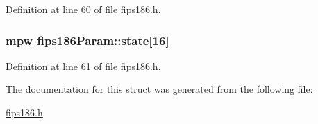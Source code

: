 Definition at line 60 of file fips186.h.\hypertarget{structfips186Param_o1}{
\subsubsection[state]{\setlength{\rightskip}{0pt plus 5cm}\hyperlink{beecrypt_8api_8h_a9}{mpw} \hyperlink{structfips186Param_o1}{fips186Param::state}\mbox{[}16\mbox{]}}}
\label{structfips186Param_o1}


Definition at line 61 of file fips186.h.

The documentation for this struct was generated from the following file:\begin{CompactItemize}
\item 
\hyperlink{fips186_8h}{fips186.h}\end{CompactItemize}

